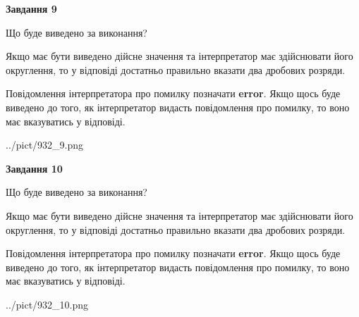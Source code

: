 \documentclass[12pt, ukrainian]{article}
\begin{document}
{\begin {Large}
{\begin {center}\textbf{Завдання 9}\end {center}}\par
Що буде виведено за виконання? \par

Якщо має бути виведено дійсне значення та інтерпретатор має здійснювати його округлення, 
то у відповіді достатньо правильно вказати два дробових розряди.

Повідомлення інтерпретатора про помилку позначати \textbf{error}.
Якщо щось буде виведено до того, як інтерпретатор видасть повідомлення про помилку, 
то воно має вказуватись у відповіді. \par

\begin{center}
	{../pict/932_9.png}
\end{center}
\newpage

{\begin {center}\textbf{Завдання 10}\end {center}}\par
Що буде виведено за виконання? \par

Якщо має бути виведено дійсне значення та інтерпретатор має здійснювати його округлення, 
то у відповіді достатньо правильно вказати два дробових розряди.

Повідомлення інтерпретатора про помилку позначати \textbf{error}.
Якщо щось буде виведено до того, як інтерпретатор видасть повідомлення про помилку, 
то воно має вказуватись у відповіді. \par

\begin{center}
	{../pict/932_10.png}
\end{center}
\newpage

\end {Large}}
\end{document}
